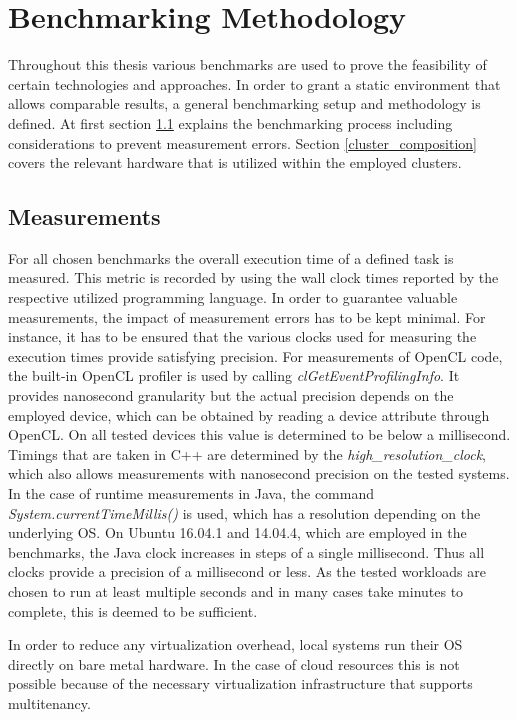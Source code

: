 \chapter{Benchmarking Methodology}
\label{benchmarking_methodology}
Throughout this thesis various benchmarks are used to prove the feasibility of certain technologies and approaches. In order to grant a static environment that allows comparable results, a general benchmarking setup and methodology is defined. At first section \ref{measurements} explains the benchmarking process including considerations to prevent measurement errors. Section \ref{cluster_composition} covers the relevant hardware that is utilized within the employed clusters.
\section{Measurements}
\label{measurements}
For all chosen benchmarks the overall execution time of a defined task is measured. This metric is recorded by using the wall clock times reported by the respective utilized programming language. In order to guarantee valuable measurements, the impact of measurement errors has to be kept minimal. For instance, it has to be ensured that the various clocks used for measuring the execution times provide satisfying precision. For measurements of OpenCL code, the built-in OpenCL profiler is used by calling \textit{clGetEventProfilingInfo}. It provides nanosecond granularity but the actual precision depends on the employed device\cite{cl_profiling}, which can be obtained by reading a device attribute through OpenCL. On all tested devices this value is determined to be below a millisecond. Timings that are taken in C++ are determined by the \textit{high\_resolution\_clock}, which also allows measurements with nanosecond precision on the tested systems. In the case of runtime measurements in Java, the command \textit{System.currentTimeMillis()} is used, which has a resolution depending on the underlying OS\cite{oracle_system}. On Ubuntu 16.04.1 and 14.04.4, which are employed in the benchmarks, the Java clock increases in steps of a single millisecond. Thus all clocks provide a precision of a millisecond or less. As the tested workloads are chosen to run at least multiple seconds and in many cases take minutes to complete, this is deemed to be sufficient.

In order to reduce any virtualization overhead, local systems run their OS directly on bare metal hardware. In the case of cloud resources this is not possible because of the necessary virtualization infrastructure that supports multitenancy.

